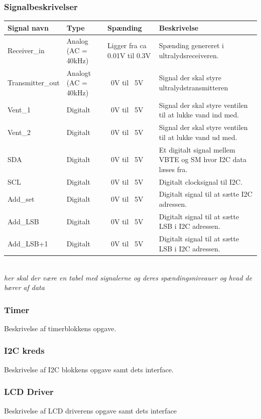 \subsubsection{Signalbeskrivelser}
\begin{tabular}{|p{3cm}|p{3cm}|p{3cm}|p{4.5cm}|} \hline
\cellcolor[gray]{0.85}Signal navn& \cellcolor[gray]{0.85}Type &\cellcolor[gray]{0.85}Spænding&\cellcolor[gray]{0.85}Beskrivelse\\ \hline
Receiver\_in & Analog (AC = 40kHz) & Ligger fra ca 0.01V til 0.3V & Spænding genereret i ultralydsreceiveren.\\ \hline
Transmitter\_out & Analogt (AC = 40kHz) & ~0V til ~5V & Signal der skal styre ultralydstransmitteren \\ \hline
Vent\_1 & Digitalt & ~0V til ~5V & Signal der skal styre ventilen til at lukke vand ind med.\\ \hline
Vent\_2 & Digitalt & ~0V til ~5V & Signal der skal styre ventilen til at lukke vand ud med.\\ \hline
SDA & Digitalt & ~0V til ~5V & Et digitalt signal mellem VBTE og SM hvor I2C data læses fra.\\ \hline
SCL & Digitalt & ~0V til ~5V & Digitalt clocksignal til I2C.\\ \hline
Add\_set & Digitalt & ~0V til ~5V & Digitalt signal til at sætte I2C adressen. \\ \hline
Add\_LSB & Digitalt & ~0V til ~5V & Digitalt signal til at sætte LSB i I2C adressen. \\ \hline
Add\_LSB+1 & Digitalt & ~0V til ~5V & Digitalt signal til at sætte LSB i I2C adressen.\\ \hline



\end{tabular}\\
\textit{her skal der være en tabel med signalerne og deres spændingsniveauer og hvad de bærer af data}
\subsubsection{Timer}
Beskrivelse af timerblokkens opgave.
\subsubsection{I2C kreds}
Beskrivelse af I2C blokkens opgave samt dets interface.
\subsubsection{LCD Driver}
Beskrivelse af LCD driverens opgave samt dets interface
